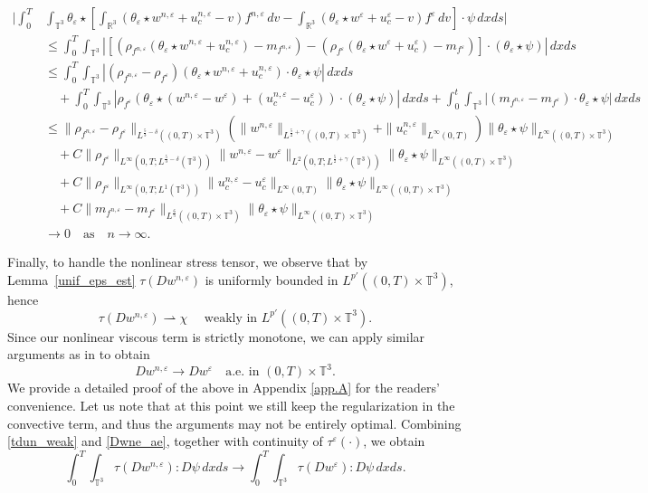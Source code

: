 \documentclass[10pt,reqno]{amsart}
\numberwithin{equation}{section}
\newcommand{\R}{\mathbb R}
\newcommand{\T}{\mathbb T}
\newcommand{\e}{\varepsilon}
\newcommand{\lt}{\left}
\newcommand{\rt}{\right}
\newcommand{\intt}{\int_{\T^3}}
\newcommand{\intr}{\int_{\R^3}}
\begin{document}
\begin{align*}
\Bigg|\int_0^T&\intt \theta_\e \star\lt[\intr (\theta_\e \star w^{n,\e} + u_c^{n,\e}-v) f^{n,\e}\,dv - \intr (\theta_\e \star w^\e + u_c^\e-v) f^\e\,dv\rt] \cdot \psi \,dxds\Bigg|\\
&\le \int_0^T \intt \lt| \lt[(\rho_{f^{n,\e}} (\theta_\e \star w^{n,\e} + u_c^{n,\e}) -m_{f^{n,\e}}) -   (\rho_{f^\e} ( \theta_\e \star w^\e + u_c^\e) -m_{f^\e})\rt]\cdot (\theta_\e \star\psi)\rt|\,dxds\\
&\le \int_0^T \intt \lt|(\rho_{f^{n,\e}} - \rho_{f^\e}) (\theta_\e \star w^{n,\e} + u_c^{n,\e}) \cdot \theta_\e\star \psi\rt|\,dxds\\
&\quad + \int_0^T \intt \lt| \rho_{f^\e} (\theta_\e\star(w^{n,\e} - w^\e) + (u_c^{n,\e}- u_c^\e) )\cdot (\theta_\e\star\psi) \rt|\,dxds + \int_0^t \intt \lt|(m_{f^{n,\e}} - m_{f^\e} )\cdot \theta_\e\star\psi  \rt|\,dxds\\
&\le \|\rho_{f^{n,\e}} - \rho_{f^\e}\|_{L^{\frac 53-\delta}((0,T)\times\T^3)}(\|w^{n,\e}\|_{L^{\frac52 +\gamma}((0,T)\times\T^3)} + \|u_c^{n,\e}\|_{L^\infty(0,T)})\|\theta_\e\star \psi\|_{L^\infty((0,T)\times\T^3)}\\
&\quad+ C\|\rho_{f^\e}\|_{L^\infty(0,T;L^{\frac 53- \delta}(\T^3))}\|w^{n,\e} - w^\e\|_{L^2(0,T;L^{\frac52 + \gamma}(\T^3))}\|\theta_\e\star\psi\|_{L^\infty((0,T)\times\T^3)}\\
&\quad +C\|\rho_{f^\e}\|_{L^\infty(0,T;L^1(\T^3))}\|u_c^{n,\e} - u_c^\e\|_{L^\infty(0,T)}\|\theta_\e\star\psi\|_{L^\infty((0,T)\times\T^3)}\\
&\quad + C\|m_{f^{n,\e}} -m_{f^\e}\|_{L^{\frac 65}((0,T)\times \T^3)}\|\theta_\e\star\psi\|_{L^\infty((0,T)\times\T^3)}\\
&\longrightarrow 0 \quad \mbox{as} \quad n \to \infty .
\end{align*}



 Finally, to handle the nonlinear stress tensor, we observe that by Lemma~\ref{unif_eps_est} 
 $\tau(Dw^{n,\e})$ is uniformly bounded in $L^{p'}((0,T) \times \T^3)$, hence
 \begin{equation}\label{tdun_weak}
 \tau(Dw^{n,\e}) {\rightharpoonup}  \chi \quad \mbox{ weakly in }L^{p'}((0,T) \times \T^3).
 \end{equation}
Since our nonlinear viscous term is strictly monotone, we can apply similar arguments as in  \cite{FMS97, FMS00} to obtain 
    \begin{equation}\label{Dwne_ae}	
    Dw^{n,\e} \to Dw^\e \quad \mbox{a.e. in }(0,T) \times \T^3. 
    \end{equation}
We provide a detailed proof of the above in Appendix \ref{app.A} for the readers' convenience. Let us note that at this point we still keep the regularization in the convective term, and thus the arguments may not be entirely optimal. Combining \eqref{tdun_weak} and \eqref{Dwne_ae}, together with continuity of $\tau^\e (\cdot)$, we obtain
\[
\int_0^T \int_{\T^3} \tau(D w^{n,\e}) : D\psi \,dxds \to \int_0^T \int_{\T^3} \tau(D w^\e) : D\psi \,dxds.
\]
\end{document}
